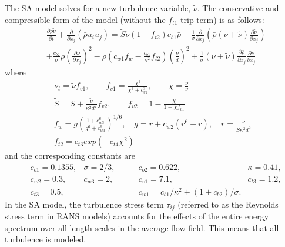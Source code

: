 The SA model solves for a new turbulence variable, $\tilde{\nu}$. The conservative and compressible form of the model (without the $f_{t1}$ trip term) is as follows\cite{SA,SAmod}:
\begin{equation}
\begin{aligned}
  &\frac{\partial\bar{\rho}\tilde{\nu}}{\partial t}+\frac{\partial}{\partial x_j}\left(\bar{\rho}{u}_i{u}_j\right) = \tilde{S}\tilde{\nu}\left(1-f_{t2}\right)c_{b1}\bar{\rho}+\frac{1}{\sigma}\frac{\partial}{\partial x_j}\left(\bar{\rho} \left(\nu+\tilde{\nu}\right)\frac{\partial \tilde{\nu}}{\partial x_j}\right)\\
  &+\frac{c_{b2}}{\sigma}\bar{\rho}\left(\frac{\partial \tilde{\nu}}{\partial x_j}\right)^2-\bar{\rho}\left(c_{w1}f_w-\frac{c_{b1}}{\kappa ^2}f_{t2}\right)\left(\frac{\tilde{\nu}}{d}\right)^2+\frac{1}{\sigma}\left(\nu+\tilde{\nu}\right)\frac{\partial \bar{\rho}}{\partial x_j}\frac{\partial \tilde{\nu}}{\partial x_j}\label{eq:SA}
\end{aligned}
\end{equation}
where  
\begin{equation}
  \begin{gathered}
    \nu_t = \tilde{\nu}f_{v1}, \qquad f_{v1}=\frac{\chi^3}{\chi^3+c_{v1}^3},\qquad \chi = \frac{\tilde{\nu}}{\nu}\\
  \tilde{S} = S + \frac{\tilde{\nu}}{\kappa ^2 d ^2}f_{v2}, \qquad f_{v2}=1-\frac{\chi}{1+\chi f_{v1}}\\
  f_w=g\left(\frac{1+c_{w3}^6}{g^6+c_{w3}^6}\right)^{1/6},\quad g=r+c_{w2}\left(r^6-r\right), \quad r=\frac{\tilde{\nu}}{\tilde{S}\kappa^2d^2}\\
    f_{t2} = c_{t3}exp\left(-c_{t4}\chi^2\right)\label{eq:SAf}
  \end{gathered}
  \end{equation}
and the corresponding constants are
\begin{equation}
  \begin{aligned}
    &c_{b1}=0.1355, &\sigma=2/3,\qquad  &c_{b2}=0.622,\qquad &\kappa=0.41, \\
    &c_{w2}=0.3,    &c_{w3}=2,  \qquad  &c_{v1}=7.1,  \qquad  &c_{t3}=1.2, \\
    &c_{t3}=0.5,  &  &c_{w1}=c_{b1}/\kappa^2+\left(1+c_{b2}\right)/\sigma.
  \end{aligned}
\end{equation}
In the SA model, the turbulence stress term $\tau _{ij}$ (referred to as the Reynolds stress term in RANS models) accounts for the effects of the entire energy spectrum over all length scales in the average flow field. This means that all turbulence is modeled. 

